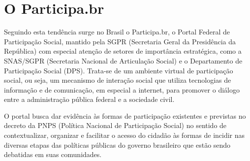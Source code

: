 \documentclass{article}
\begin{document}
\section{O Participa.br}

%


Seguindo esta tendência surge no Brasil o Participa.br, o Portal Federal de
Participação Social, mantido pela SGPR (Secretaria Geral da Presidência da
República) com especial atenção de setores de importância estratégica, como a
SNAS/SGPR (Secretaria Nacional de Articulação Social) e o Departamento de
Participação Social (DPS). Trata-se de um ambiente virtual de participação
social, ou seja, um mecanismo de interação social que utiliza tecnologias de
informação e de comunicação, em especial a internet, para promover o diálogo
entre a administração pública federal e a sociedade civil.


O portal busca dar evidência às formas de participação existentes e previstas
no decreto da PNPS (Política Nacional de Participação Social) no sentido de
contextualizar, organizar e facilitar o acesso do cidadão às formas de incidir
nas diversas etapas das políticas públicas do governo brasileiro que estão
sendo debatidas em suas comunidades.
\end{document}
